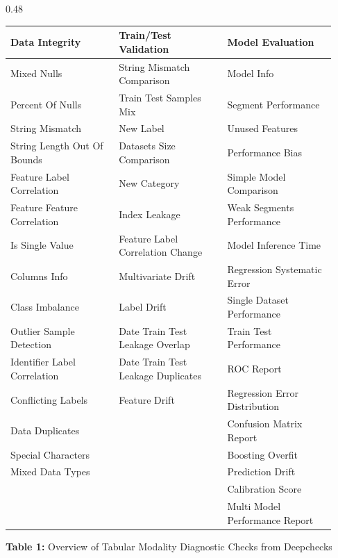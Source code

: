 \documentclass[final,t]{beamer}
\begin{document}
\begin{frame}[fragile]
\begin{columns}[T]
\begin{column}{0.48\textwidth}
\begin{posterblock}
  \vspace{3mm}
  \centering
  {\fontsize{19}{24}\selectfont
  \begin{tabular}{p{0.31\linewidth} p{0.31\linewidth} p{0.31\linewidth}}
    \toprule
    \textbf{Data Integrity} & \textbf{Train/Test Validation} & \textbf{Model Evaluation} \\
    \midrule
    Mixed Nulls & String Mismatch Comparison & Model Info \\
    Percent Of Nulls & Train Test Samples Mix & Segment Performance \\
    String Mismatch & New Label & Unused Features \\
    String Length Out Of Bounds & Datasets Size Comparison & Performance Bias \\
    Feature Label Correlation & New Category & Simple Model Comparison \\
    Feature Feature Correlation & Index Leakage & Weak Segments Performance \\
    Is Single Value & Feature Label Correlation Change & Model Inference Time \\
    Columns Info & Multivariate Drift & Regression Systematic Error \\
    Class Imbalance & Label Drift & Single Dataset Performance \\
    Outlier Sample Detection & Date Train Test Leakage Overlap & Train Test Performance \\
    Identifier Label Correlation & Date Train Test Leakage Duplicates & ROC Report \\
    Conflicting Labels & Feature Drift & Regression Error Distribution \\
    Data Duplicates & & Confusion Matrix Report \\
    Special Characters & & Boosting Overfit \\
    Mixed Data Types & & Prediction Drift \\
    & & Calibration Score \\
    & & Multi Model Performance Report \\
    \bottomrule
  \end{tabular}\par}
  \vspace{4mm}
  {\fontsize{20}{26}\selectfont\color{LightText}\textbf{Table 1:} Overview of Tabular Modality Diagnostic Checks from Deepchecks}
\end{posterblock}

\vspace{12mm}


\end{column}
\end{columns}
\end{frame}
\end{document}
